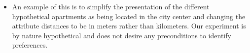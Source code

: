 \documentclass[
]{article}
\providecommand{\tightlist}{%
  \setlength{\itemsep}{0pt}\setlength{\parskip}{0pt}}
\begin{document}
\begin{itemize}
  \begin{itemize}
  \tightlist
  \item
    An example of this is to simplify the presentation of the different
    hypothetical apartments as being located in the city center and
    changing the attribute distances to be in meters rather than
    kilometers. Our experiment is by nature hypothetical and does not
    desire any preconditions to identify preferences.
  \end{itemize}
\end{itemize}
\end{document}

